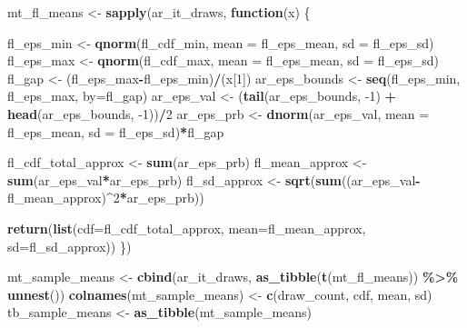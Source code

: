 \documentclass[
]{book}
\newenvironment{Shaded}{\begin{snugshade}}{\end{snugshade}}
\newcommand{\ControlFlowTok}[1]{\textcolor[rgb]{0.13,0.29,0.53}{\textbf{#1}}}
\newcommand{\DataTypeTok}[1]{\textcolor[rgb]{0.13,0.29,0.53}{#1}}
\newcommand{\DecValTok}[1]{\textcolor[rgb]{0.00,0.00,0.81}{#1}}
\newcommand{\KeywordTok}[1]{\textcolor[rgb]{0.13,0.29,0.53}{\textbf{#1}}}
\newcommand{\NormalTok}[1]{#1}
\newcommand{\OperatorTok}[1]{\textcolor[rgb]{0.81,0.36,0.00}{\textbf{#1}}}
\newcommand{\StringTok}[1]{\textcolor[rgb]{0.31,0.60,0.02}{#1}}
\begin{document}
\begin{Shaded}
\begin{Highlighting}[]
\NormalTok{mt\_fl\_means \textless{}{-}}
\StringTok{  }\KeywordTok{sapply}\NormalTok{(ar\_it\_draws, }\ControlFlowTok{function}\NormalTok{(x) \{}

\NormalTok{    fl\_eps\_min \textless{}{-}}\StringTok{ }\KeywordTok{qnorm}\NormalTok{(fl\_cdf\_min, }\DataTypeTok{mean =}\NormalTok{ fl\_eps\_mean, }\DataTypeTok{sd =}\NormalTok{ fl\_eps\_sd)}
\NormalTok{    fl\_eps\_max \textless{}{-}}\StringTok{ }\KeywordTok{qnorm}\NormalTok{(fl\_cdf\_max, }\DataTypeTok{mean =}\NormalTok{ fl\_eps\_mean, }\DataTypeTok{sd =}\NormalTok{ fl\_eps\_sd)}
\NormalTok{    fl\_gap \textless{}{-}}\StringTok{ }\NormalTok{(fl\_eps\_max}\OperatorTok{{-}}\NormalTok{fl\_eps\_min)}\OperatorTok{/}\NormalTok{(x[}\DecValTok{1}\NormalTok{])}
\NormalTok{    ar\_eps\_bounds \textless{}{-}}\StringTok{ }\KeywordTok{seq}\NormalTok{(fl\_eps\_min, fl\_eps\_max, }\DataTypeTok{by=}\NormalTok{fl\_gap)}
\NormalTok{    ar\_eps\_val \textless{}{-}}\StringTok{ }\NormalTok{(}\KeywordTok{tail}\NormalTok{(ar\_eps\_bounds, }\DecValTok{{-}1}\NormalTok{) }\OperatorTok{+}\StringTok{ }\KeywordTok{head}\NormalTok{(ar\_eps\_bounds, }\DecValTok{{-}1}\NormalTok{))}\OperatorTok{/}\DecValTok{2}
\NormalTok{    ar\_eps\_prb \textless{}{-}}\StringTok{ }\KeywordTok{dnorm}\NormalTok{(ar\_eps\_val, }\DataTypeTok{mean =}\NormalTok{ fl\_eps\_mean, }\DataTypeTok{sd =}\NormalTok{ fl\_eps\_sd)}\OperatorTok{*}\NormalTok{fl\_gap}

\NormalTok{    fl\_cdf\_total\_approx \textless{}{-}}\StringTok{ }\KeywordTok{sum}\NormalTok{(ar\_eps\_prb)}
\NormalTok{    fl\_mean\_approx \textless{}{-}}\StringTok{ }\KeywordTok{sum}\NormalTok{(ar\_eps\_val}\OperatorTok{*}\NormalTok{ar\_eps\_prb)}
\NormalTok{    fl\_sd\_approx \textless{}{-}}\StringTok{ }\KeywordTok{sqrt}\NormalTok{(}\KeywordTok{sum}\NormalTok{((ar\_eps\_val}\OperatorTok{{-}}\NormalTok{fl\_mean\_approx)}\OperatorTok{\^{}}\DecValTok{2}\OperatorTok{*}\NormalTok{ar\_eps\_prb))}

    \KeywordTok{return}\NormalTok{(}\KeywordTok{list}\NormalTok{(}\DataTypeTok{cdf=}\NormalTok{fl\_cdf\_total\_approx, }\DataTypeTok{mean=}\NormalTok{fl\_mean\_approx, }\DataTypeTok{sd=}\NormalTok{fl\_sd\_approx))}
\NormalTok{  \})}

\NormalTok{mt\_sample\_means \textless{}{-}}\StringTok{ }\KeywordTok{cbind}\NormalTok{(ar\_it\_draws, }\KeywordTok{as\_tibble}\NormalTok{(}\KeywordTok{t}\NormalTok{(mt\_fl\_means)) }\OperatorTok{\%\textgreater{}\%}\StringTok{ }\KeywordTok{unnest}\NormalTok{())}
\KeywordTok{colnames}\NormalTok{(mt\_sample\_means) \textless{}{-}}\StringTok{ }\KeywordTok{c}\NormalTok{(}\StringTok{\textquotesingle{}draw\_count\textquotesingle{}}\NormalTok{, }\StringTok{\textquotesingle{}cdf\textquotesingle{}}\NormalTok{, }\StringTok{\textquotesingle{}mean\textquotesingle{}}\NormalTok{, }\StringTok{\textquotesingle{}sd\textquotesingle{}}\NormalTok{)}
\NormalTok{tb\_sample\_means \textless{}{-}}\StringTok{ }\KeywordTok{as\_tibble}\NormalTok{(mt\_sample\_means)}


\end{Highlighting}
\end{Shaded}
\end{document}
